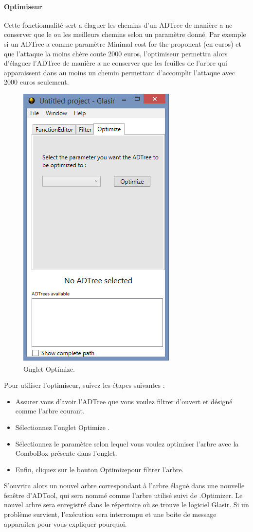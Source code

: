 \paragraph{Optimiseur}Cette fonctionnalité sert a élaguer les chemins d'un ADTree de manière a ne conserver que le ou les meilleurs chemins selon un paramètre donné. Par exemple si un ADTree a comme paramètre \og Minimal cost for the proponent \fg (en euros) et que l'attaque la moins chère coute 2000 euros, l'optimiseur permettra alors d'élaguer l'ADTree de manière a ne conserver que les feuilles de l'arbre qui apparaissent dans au moins un chemin permettant d'accomplir l'attaque avec 2000 euros seulement.

 \begin{figure}[!h]
        \centering
        \includegraphics[height=0.7\textwidth]{figure/optimizer.png}
        \caption{Onglet Optimize.}
        \label{fig:opti}
    \end{figure}

Pour utiliser l'optimiseur, suivez les étapes suivantes :
\begin{itemize}
\item Assurer vous d'avoir l'ADTree que vous voulez filtrer d'ouvert et désigné comme l'arbre courant. 
\item Sélectionnez l'onglet \og Optimize \fg .
\item Sélectionnez le paramètre selon lequel vous voulez optimiser l'arbre avec la ComboBox présente dans l'onglet.
\item Enfin, cliquez sur le bouton \og Optimize\fg pour filtrer l'arbre.
\end{itemize}
S'ouvrira alors un nouvel arbre correspondant à l'arbre élagué dans une nouvelle fenêtre d'ADTool, qui sera nommé comme l'arbre utilisé suivi de \og .Optimizer\fg . Le nouvel arbre sera enregistré dans le répertoire où se trouve le logiciel Glasir.
Si un problème survient, l'exécution sera interrompu et une boite de message apparaitra pour vous expliquer pourquoi.

